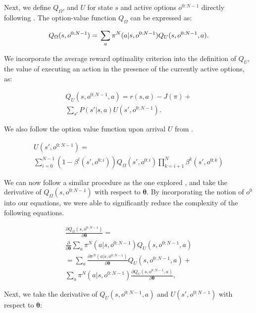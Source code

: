 \documentclass[letterpaper]{article} %
\begin{document}
Next, we define $Q_\Omega$, and $U$ for state $s$ and active options $o^{0:N-1}$ directly following \cite{hoc}. The option-value function $Q_\Omega$ can be expressed as:

\begin{equation} 
Q_\Omega(s,o^{0:N-1}) =\\
\sum_{a} \pi^N(a|s,o^{0:N-1})Q_U(s,o^{0:N-1},a).
\end{equation}

We incorporate the average reward optimality criterion into the definition of  $Q_U$, the value of executing an action in the presence of the currently active options, as: 

\begin{equation} 
\begin{split}
Q_U(s,o^{0:N-1},a) = r(s,a) - J(\pi) + \\
\sum_{s'} P (s'|s,a)U(s',o^{0:N-1}).
\end{split}
\end{equation}

We also follow the option value function upon arrival $U$ from \cite{hoc}. 

\begin{align*}
U(s',o^{0:N-1}) =\\
\sum_{i=0}^{N-1}(1-  \beta^i(s',o^{0:i})) Q_\Omega(s',o^{0:i}) \prod_{k=i+1}^{N} \beta^k(s',o^{0:k}) 
\end{align*}


We can now follow a similar procedure as the one explored \cite{weightsharingAAAI}, and take the derivative of $Q_\Omega(s,o^{0:N-1})$ with respect to $\bm{\theta}$. By incorporating the notion of $o^{0}$ into our equations, we were able to significantly reduce the complexity of the following equations. 

\begin{equation}  \label{QOmega}
\begin{split}
\frac{\partial Q_\Omega(s,o^{0:N-1})}{\partial \bm{\theta}} =\\
\frac{\partial}{\partial \bm{\theta}}\sum_{a} \pi^N(a|s,o^{0:N-1})Q_U(s,o^{0:N-1},a) \\ 
= \sum_{a} \frac{ \partial \pi^N(a|s,o^{0:N-1})}{\partial \bm{\theta}} Q_U(s,o^{0:N-1},a)
+ \\
\sum_{a} \pi^N(a|s,o^{0:N-1}) \frac{\partial Q_U(s,o^{0:N-1},a)}{\partial \bm{\theta}},
\end{split}
\end{equation}

Next, we take the derivative of $Q_U(s,o^{0:N-1},a)$ and $U(s',o^{0:N-1})$ with respect to $\bm{\theta}$:
\end{document}

